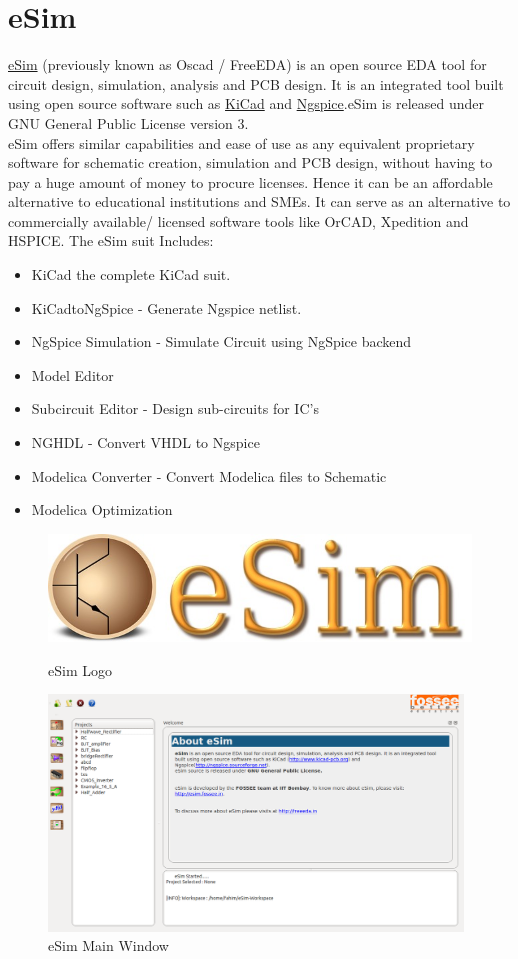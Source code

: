 \documentclass[12pt,a4paper]{report}
\begin{document}
\section{eSim}
\href{https://esim.fossee.in/}{eSim} (previously known as Oscad / FreeEDA) is an open source EDA tool for circuit design, simulation, analysis and PCB design. It is an integrated tool built using open source software such as \href{http://www.kicad-pcb.org}{KiCad} and \href{http://ngspice.sourceforge.net/}{Ngspice}.eSim is released under GNU General Public License version 3.
\\
eSim offers similar capabilities and ease of use as any equivalent proprietary software for schematic creation, simulation and PCB design, without having to pay a huge amount of money to procure licenses. Hence it can be an affordable alternative to educational institutions and SMEs. It can serve as an alternative to commercially available/ licensed software tools like OrCAD, Xpedition and HSPICE.
The eSim suit Includes: 
\begin{itemize}
	\itemsep0em 
	\item KiCad  the complete KiCad suit.
	\item KiCadtoNgSpice - Generate Ngspice netlist.
	\item NgSpice Simulation - Simulate Circuit using NgSpice backend
	\item Model Editor
	\item Subcircuit Editor - Design sub-circuits for IC's 
	\item NGHDL - Convert VHDL to Ngspice
	\item Modelica Converter - Convert Modelica files to Schematic
	\item Modelica Optimization
\end{itemize}

\begin{figure}[h]
	\centering
	\includegraphics[scale=0.2]{eSim-logo}
	\caption{eSim Logo}
	\vspace{5mm}
	\includegraphics[width=11cm]{eSim}
	\caption{eSim Main Window}
\end{figure}
\end{document}
